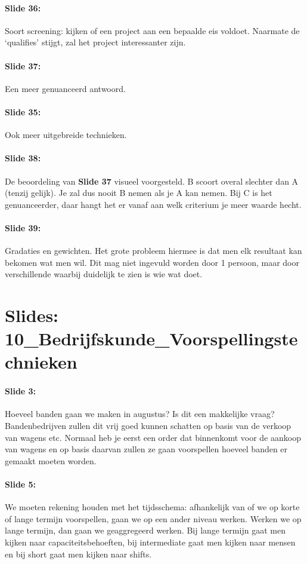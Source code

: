 \documentclass[10pt,a4paper]{report}
\begin{document}
\paragraph{Slide 36:} Soort screening: kijken of een project aan een bepaalde eis voldoet. Naarmate de `qualifies' stijgt, zal het project interessanter zijn.

\paragraph{Slide 37:} Een meer genuanceerd antwoord.

\paragraph{Slide 35:} Ook meer uitgebreide technieken.

\paragraph{Slide 38:} De beoordeling van \textbf{Slide 37} visueel voorgesteld. B scoort overal slechter dan A (tenzij gelijk). Je zal dus nooit B nemen als je A kan nemen. Bij C is het genuanceerder, daar hangt het er vanaf aan welk criterium je meer waarde hecht.

\paragraph{Slide 39:} Gradaties en gewichten. Het grote probleem hiermee is dat men elk resultaat kan bekomen wat men wil. Dit mag niet ingevuld worden door 1 persoon, maar door verschillende waarbij duidelijk te zien is wie wat doet.

\section{Slides: 10\_Bedrijfskunde\_Voorspellingstechnieken}

\paragraph{Slide 3:} Hoeveel banden gaan we maken in augustus? Is dit een makkelijke vraag? Bandenbedrijven zullen dit vrij goed kunnen schatten op basis van de verkoop van wagens etc. Normaal heb je eerst een order dat binnenkomt voor de aankoop van wagens en op basis daarvan zullen ze gaan voorspellen hoeveel banden er gemaakt moeten worden.

\paragraph{Slide 5:} We moeten rekening houden met het tijdsschema: afhankelijk van of we op korte of lange termijn voorspellen, gaan we op een ander niveau werken. Werken we op lange termijn, dan gaan we geaggregeerd werken. Bij lange termijn gaat men kijken naar capaciteitsbehoeften, bij intermediate gaat men kijken naar mensen en bij short gaat men kijken naar shifts.
\end{document}
